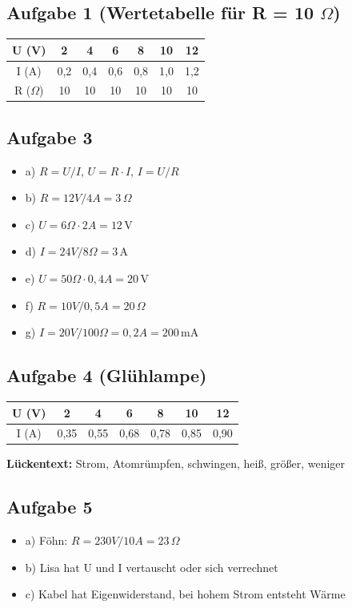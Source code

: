 \documentclass[11pt, a4paper]{article}
\begin{document}
\subsection*{Aufgabe 1 (Wertetabelle für R = 10 $\Omega$)}
\begin{center}
\begin{tabular}{|c|c|c|c|c|c|c|}
\hline
U (V) & 2 & 4 & 6 & 8 & 10 & 12 \\
\hline
I (A) & 0,2 & 0,4 & 0,6 & 0,8 & 1,0 & 1,2 \\
\hline
R ($\Omega$) & 10 & 10 & 10 & 10 & 10 & 10 \\
\hline
\end{tabular}
\end{center}

\subsection*{Aufgabe 3}
\begin{itemize}[leftmargin=1.5em]
    \item a) $R = U/I$, $U = R \cdot I$, $I = U/R$
    \item b) $R = 12V / 4A = 3\,\Omega$
    \item c) $U = 6\Omega \cdot 2A = 12\,$V
    \item d) $I = 24V / 8\Omega = 3\,$A
    \item e) $U = 50\Omega \cdot 0{,}4A = 20\,$V
    \item f) $R = 10V / 0{,}5A = 20\,\Omega$
    \item g) $I = 20V / 100\Omega = 0{,}2A = 200\,$mA
\end{itemize}

\subsection*{Aufgabe 4 (Glühlampe)}
\begin{center}
\begin{tabular}{|c|c|c|c|c|c|c|}
\hline
U (V) & 2 & 4 & 6 & 8 & 10 & 12 \\
\hline
I (A) & 0,35 & 0,55 & 0,68 & 0,78 & 0,85 & 0,90 \\
\hline
\end{tabular}
\end{center}

\textbf{Lückentext:} Strom, Atomrümpfen, schwingen, heiß, größer, weniger

\subsection*{Aufgabe 5}
\begin{itemize}[leftmargin=1.5em]
    \item a) Föhn: $R = 230V / 10A = 23\,\Omega$
    \item b) Lisa hat U und I vertauscht oder sich verrechnet
    \item c) Kabel hat Eigenwiderstand, bei hohem Strom entsteht Wärme
\end{itemize}
\end{document}
